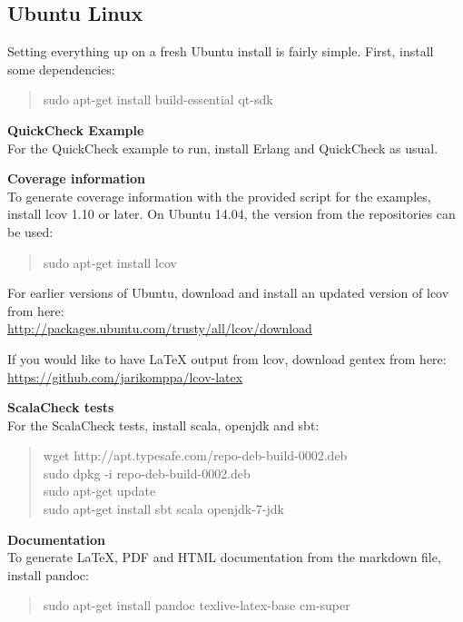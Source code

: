 \subsection{Ubuntu Linux}\label{ubuntu-linux}

Setting everything up on a fresh Ubuntu install is fairly simple. First,
install some dependencies:

\begin{quote}
sudo apt-get install build-essential qt-sdk
\end{quote}

\textbf{QuickCheck Example}\\For the QuickCheck example to run, install
Erlang and QuickCheck as usual.

\textbf{Coverage information}\\To generate coverage information with the
provided script for the examples, install lcov 1.10 or later. On Ubuntu
14.04, the version from the repositories can be used:

\begin{quote}
sudo apt-get install lcov
\end{quote}

For earlier versions of Ubuntu, download and install an updated version
of lcov from
here:\\\url{http://packages.ubuntu.com/trusty/all/lcov/download}

If you would like to have LaTeX output from lcov, download gentex from
here:\\\url{https://github.com/jarikomppa/lcov-latex}

\textbf{ScalaCheck tests}\\For the ScalaCheck tests, install scala,
openjdk and sbt:

\begin{quote}
wget http://apt.typesafe.com/repo-deb-build-0002.deb\\sudo dpkg -i
repo-deb-build-0002.deb\\sudo apt-get update\\sudo apt-get install sbt
scala openjdk-7-jdk
\end{quote}

\textbf{Documentation}\\To generate LaTeX, PDF and HTML documentation
from the markdown file, install pandoc:

\begin{quote}
sudo apt-get install pandoc texlive-latex-base cm-super
\end{quote}

